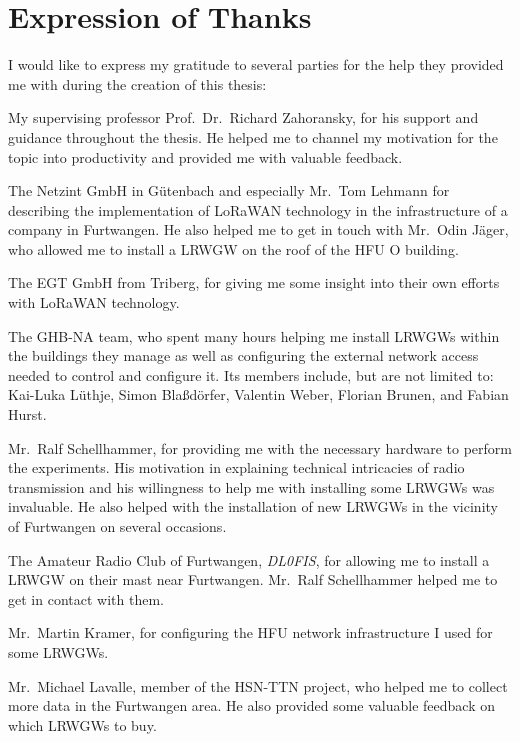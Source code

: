 \section{Expression of Thanks}\label{sec:expression-of-thanks}

I would like to express my gratitude to several parties for the help they provided me with during the creation of this thesis:

My supervising professor Prof.\ Dr.\ Richard Zahoransky, for his support and guidance throughout the thesis.
He helped me to channel my motivation for the topic into productivity and provided me with valuable feedback.

The Netzint GmbH in Gütenbach and especially Mr.\ Tom Lehmann for describing the implementation of \ac{LoRaWAN} technology in the infrastructure of a company in Furtwangen.
He also helped me to get in touch with Mr.\ Odin Jäger, who allowed me to install a \acl{LRWGW} on the roof of the \ac{HFU} O building.

The EGT GmbH from Triberg, for giving me some insight into their own efforts with \ac{LoRaWAN} technology.

The \acl{GHB-NA} team, who spent many hours helping me install \aclp{LRWGW} within the buildings they manage as well as configuring the external network access needed to control and configure it.
Its members include, but are not limited to: Kai-Luka Lüthje, Simon Blaßdörfer, Valentin Weber, Florian Brunen, and Fabian Hurst.

Mr.\ Ralf Schellhammer, for providing me with the necessary hardware to perform the experiments.
His motivation in explaining technical intricacies of radio transmission and his willingness to help me with installing some \aclp{LRWGW} was invaluable.
He also helped with the installation of new \aclp{LRWGW} in the vicinity of Furtwangen on several occasions.

The Amateur Radio Club of Furtwangen, \emph{DL0FIS}, for allowing me to install a \acl{LRWGW} on their mast near Furtwangen.
Mr.\ Ralf Schellhammer helped me to get in contact with them.

Mr.\ Martin Kramer, for configuring the \ac{HFU} network infrastructure I used for some \aclp{LRWGW}.

Mr.\ Michael Lavalle, member of the \ac{HSN-TTN} project, who helped me to collect more data in the Furtwangen area.
He also provided some valuable feedback on which \aclp{LRWGW} to buy.


